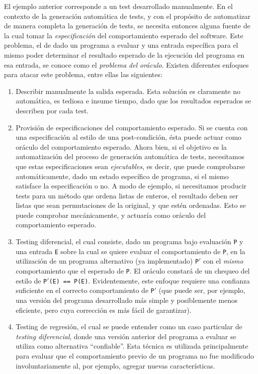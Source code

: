 El ejemplo anterior corresponde a un test desarrollado manualmente. En el contexto de la generaci\'on autom\'atica de tests, y con el prop\'osito de automatizar de manera completa la generaci\'on de tests, se necesita entonces alguna fuente de la cual tomar la \emph{especificaci\'on} del comportamiento esperado del software. Este problema, el de dado un programa a evaluar y una entrada espec\'ifica para el mismo poder determinar el resultado esperado de la ejecuci\'on del programa en esa entrada, se conoce como el \emph{problema del or\'aculo}. Existen diferentes enfoques para atacar este problema, entre ellas las siguientes: 
\begin{enumerate}
	\item Describir manualmente la salida esperada. Esta soluci\'on es claramente no autom\'atica, es tediosa e insume tiempo, dado que los resultados esperados se describen por cada test.
	
    \item Provisi\'on de especificaciones del comportamiento esperado. Si se cuenta con una especificaci\'on al estilo de una post-condici\'on, \'esta puede actuar como or\'aculo del comportamiento esperado. Ahora bien, si el objetivo es la automatizaci\'on del proceso de generaci\'on autom\'atica de tests, necesitamos que estas especificaciones sean \emph{ejecutables}, es decir, que puede comprobarse autom\'aticamente, dado un estado espec\'ifico de programa, si el mismo satisface la especificaci\'on o no. A modo de ejemplo, si necesitamos producir tests para un m\'etodo que ordena listas de enteros, el resultado deben ser listas que sean permutaciones de la original, y que est\'en ordenadas. Esto se puede comprobar mec\'anicamente, y actuar\'ia como or\'aculo del comportamiento esperado. 
	
	\item Testing diferencial, el cual consiste, dado un programa bajo evaluaci\'on \texttt{P} y una entrada \texttt{E} sobre la cual se quiere evaluar el comportamiento de \texttt{P}, en la utilizaci\'on de un programa alternativo (ya implementado) \texttt{P$\prime$} con el \emph{mismo} comportamiento que el esperado de \texttt{P}. El or\'aculo constar\'a de un chequeo del estilo de \texttt{P$\prime$(E) == P(E)}. Evidentemente, este enfoque requiere una confianza suficiente en el correcto comportamiento de \texttt{P$\prime$} (que puede ser, por ejemplo, una versi\'on del programa desarrollado m\'as simple y posiblemente menos eficiente, pero cuya correcci\'on es m\'as f\'acil de garantizar). 
	
	\item Testing de regresi\'on, el cual se puede entender como un caso particular de \emph{testing diferencial}, donde una versi\'on anterior del programa a evaluar se utiliza como alternativa ``confiable''. Esta t\'ecnica es utilizada principalmente para evaluar que el comportamiento previo de un programa no fue modificado involuntariamente al, por ejemplo, agregar nuevas caracter\'isticas.
	
\end{enumerate}


